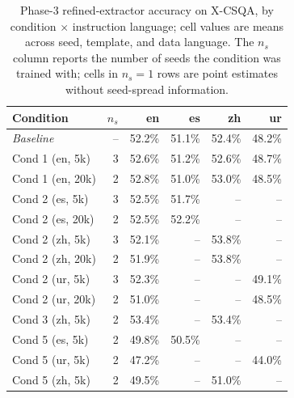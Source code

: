 \begin{table}[t]
  \centering
  \small
  \begin{tabular}{lrrrrr}
    \toprule
    Condition & $n_s$ & en & es & zh & ur \\
    \midrule
    \textit{Baseline} & -- & 52.2\% & 51.1\% & 52.4\% & 48.2\% \\
    Cond 1 (en, 5k) & 3 & 52.6\% & 51.2\% & 52.6\% & 48.7\% \\
    Cond 1 (en, 20k) & 2 & 52.8\% & 51.0\% & 53.0\% & 48.5\% \\
    Cond 2 (es, 5k) & 3 & 52.5\% & 51.7\% & -- & -- \\
    Cond 2 (es, 20k) & 2 & 52.5\% & 52.2\% & -- & -- \\
    Cond 2 (zh, 5k) & 3 & 52.1\% & -- & 53.8\% & -- \\
    Cond 2 (zh, 20k) & 2 & 51.9\% & -- & 53.8\% & -- \\
    Cond 2 (ur, 5k) & 3 & 52.3\% & -- & -- & 49.1\% \\
    Cond 2 (ur, 20k) & 2 & 51.0\% & -- & -- & 48.5\% \\
    Cond 3 (zh, 5k) & 2 & 53.4\% & -- & 53.4\% & -- \\
    Cond 5 (es, 5k) & 2 & 49.8\% & 50.5\% & -- & -- \\
    Cond 5 (ur, 5k) & 2 & 47.2\% & -- & -- & 44.0\% \\
    Cond 5 (zh, 5k) & 2 & 49.5\% & -- & 51.0\% & -- \\
    \bottomrule
  \end{tabular}
  \caption{Phase-3 refined-extractor accuracy on \textsc{X-CSQA}, by condition $\times$ instruction language; cell values are means across seed, template, and data language. The $n_s$ column reports the number of seeds the condition was trained with; cells in $n_s\!=\!1$ rows are point estimates without seed-spread information.}
  \label{tab:t1-xcsqa}
\end{table}

